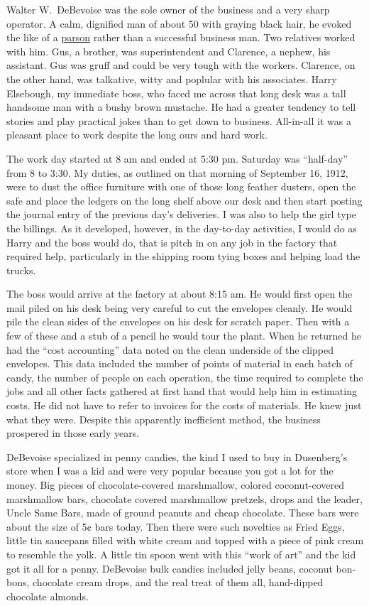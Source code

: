\documentclass[12pt]{book}              %
\begin{document}
Walter W.~DeBevoise was the sole owner of the business and a very sharp operator. A calm, dignified man of about 50 with graying black hair, he evoked the like of a \href{http://en.wikipedia.org/wiki/Parson}{parson} rather than a successful business man. Two relatives worked with him. Gus, a brother, was superintendent and Clarence, a nephew, his assistant. Gus was gruff and could be very tough with the workers. Clarence, on the other hand, was talkative, witty and poplular with his associates. Harry Elsebough, my immediate boss, who faced me across that long desk was a tall handsome man with a bushy brown mustache. He had a greater tendency to tell stories and play practical jokes than to get down to business. All-in-all it was a pleasant place to work despite the long ours and hard work.

The work day started at 8 am and ended at 5:30 pm. Saturday was ``half-day'' from 8 to 3:30. My duties, as outlined on that morning of September 16, 1912, were to dust the office furniture with one of those long feather dusters, open the safe and place the ledgers on the long shelf above our desk and then start posting the journal entry of the previous day's deliveries. I was also to help the girl type the billings. As it developed, however, in the day-to-day activities, I would do as Harry and the boss would do, that is pitch in on any job in the factory that required help, particularly in the shipping room tying boxes and helping load the trucks. 

The boss would arrive at the factory at about 8:15 am. He would first open the mail piled on his desk being very careful to cut the envelopes cleanly. He would pile the clean sides of the envelopes on his desk for scratch paper. Then with a few of these and a stub of a pencil he would tour the plant. When he returned he had the ``cost accounting'' data noted on the clean underside of the clipped envelopes. This data included the number of points of material in each batch of candy, the number of people on each operation, the time required to complete the jobs and all other facts gathered at first hand that would help him in estimating costs. He did not have to refer to invoices for the costs of materials. He knew just what they were. Despite this apparently inefficient method, the business prospered in those early years.

DeBevoise specialized in penny candies, the kind I used to buy in Dusenberg's store when I was a kid and were very popular because you got a lot for the money. Big pieces of chocolate-covered marshmallow, colored coconut-covered marshmallow bars, chocolate covered marshmallow pretzels, drops and the leader, Uncle Same Bars, made of ground peanuts and cheap chocolate. These bars were about the size of 5$\cent$ bars today. Then there were such novelties as Fried Eggs, little tin saucepans filled with white cream and topped with a piece of pink cream to resemble the yolk. A little tin spoon went with this ``work of art'' and the kid got it all for a penny. DeBevoise bulk candies included jelly beans, coconut bon-bons, chocolate cream drops, and the real treat of them all, hand-dipped chocolate almonds.
\end{document}
